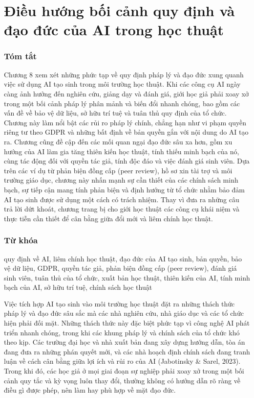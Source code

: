 \chapter{Điều hướng bối cảnh quy định và đạo đức của AI trong học thuật}

\subsection{Tóm tắt}

Chương 8 xem xét những phức tạp về quy định pháp lý và đạo đức xung quanh việc sử dụng AI tạo sinh trong môi trường học thuật. Khi các công cụ AI ngày càng ảnh hưởng đến nghiên cứu, giảng dạy và đánh giá, giới học giả phải xoay xở trong một bối cảnh pháp lý phân mảnh và biến đổi nhanh chóng, bao gồm các vấn đề về bảo vệ dữ liệu, sở hữu trí tuệ và tuân thủ quy định của tổ chức. Chương này làm nổi bật các rủi ro pháp lý chính, chẳng hạn như vi phạm quyền riêng tư theo GDPR và những bất định về bản quyền gắn với nội dung do AI tạo ra. Chương cũng đề cập đến các mối quan ngại đạo đức sâu xa hơn, gồm xu hướng của AI làm gia tăng thiên kiến học thuật, tính thiếu minh bạch của nó, cùng tác động đối với quyền tác giả, tính độc đáo và việc đánh giá sinh viên. Dựa trên các ví dụ từ phản biện đồng cấp (peer review), hồ sơ xin tài trợ và môi trường giáo dục, chương này nhấn mạnh sự cần thiết của các chính sách minh bạch, sự tiếp cận mang tính phản biện và định hướng từ tổ chức nhằm bảo đảm AI tạo sinh được sử dụng một cách có trách nhiệm. Thay vì đưa ra những câu trả lời dứt khoát, chương trang bị cho giới học thuật các công cụ khái niệm và thực tiễn cần thiết để cân bằng giữa đổi mới và liêm chính học thuật.

\subsection{Từ khóa}

quy định về AI, liêm chính học thuật, đạo đức của AI tạo sinh, bản quyền, bảo vệ dữ liệu, GDPR, quyền tác giả, phản biện đồng cấp (peer review), đánh giá sinh viên, tuân thủ của tổ chức, xuất bản học thuật, thiên kiến của AI, tính minh bạch của AI, sở hữu trí tuệ, chính sách học thuật

Việc tích hợp AI tạo sinh vào môi trường học thuật đặt ra những thách thức pháp lý và đạo đức sâu sắc mà các nhà nghiên cứu, nhà giáo dục và các tổ chức hiện phải đối mặt. Những thách thức này đặc biệt phức tạp vì công nghệ AI phát triển nhanh chóng, trong khi các khung pháp lý và chính sách của tổ chức khó theo kịp. Các trường đại học và nhà xuất bản đang xây dựng hướng dẫn, tòa án đang đưa ra những phán quyết mới, và các nhà hoạch định chính sách đang tranh luận về cách cân bằng giữa lợi ích và rủi ro của AI (Jabotinsky \& Sarel, 2023). Trong khi đó, các học giả ở mọi giai đoạn sự nghiệp phải xoay xở trong một bối cảnh quy tắc và kỳ vọng luôn thay đổi, thường không có hướng dẫn rõ ràng về điều gì được phép, nên làm hay phù hợp về mặt đạo đức.

